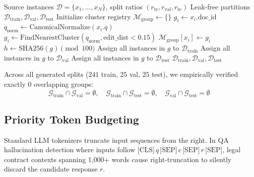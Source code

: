 \documentclass[conference]{IEEEtran}
\begin{document}
\begin{algorithm}[t]
\caption{Automated Anti-Leakage Clustering and Split Allocation}
\label{alg:leak_prevention}
\begin{algorithmic}[1]
\REQUIRE Source instances $\mathcal{D} = \{x_1, \dots, x_N\}$, split ratios $(r_{\text{tr}}, r_{\text{val}}, r_{\text{te}})$
\ENSURE Leak-free partitions $\mathcal{D}_{\text{train}}, \mathcal{D}_{\text{val}}, \mathcal{D}_{\text{test}}$
\STATE Initialize cluster registry $\mathcal{M}_{\text{group}} \leftarrow \{\}$
        \STATE $g_i \leftarrow x_i.\text{doc\_id}$
    \ELSE
        \STATE $q_{\text{norm}} \leftarrow \text{CanonicalNormalize}(x_i.q)$
        \STATE $g_i \leftarrow \text{FindNearestCluster}(q_{\text{norm}}, \text{edit\_dist} < 0.15)$
    \ENDIF
    \STATE $\mathcal{M}_{\text{group}}[x_i] \leftarrow g_i$
\ENDFOR
{}
    \STATE $h \leftarrow \text{SHA256}(g) \pmod{100}$
        \STATE Assign all instances in $g$ to $\mathcal{D}_{\text{train}}$
        \STATE Assign all instances in $g$ to $\mathcal{D}_{\text{val}}$
    \ELSE
        \STATE Assign all instances in $g$ to $\mathcal{D}_{\text{test}}$
    \ENDIF
\ENDFOR
\RETURN $\mathcal{D}_{\text{train}}, \mathcal{D}_{\text{val}}, \mathcal{D}_{\text{test}}$
\end{algorithmic}
\end{algorithm}

Across all generated splits ($241$ train, $25$ val, $25$ test), we empirically verified exactly $0$ overlapping groups:
\begin{equation}
\mathcal{G}_{\text{train}} \cap \mathcal{G}_{\text{val}} = \emptyset, \quad \mathcal{G}_{\text{train}} \cap \mathcal{G}_{\text{test}} = \emptyset, \quad \mathcal{G}_{\text{val}} \cap \mathcal{G}_{\text{test}} = \emptyset
\label{eq:zero_leakage}
\end{equation}

\subsection{Priority Token Budgeting}
Standard LLM tokenizers truncate input sequences from the right. In QA hallucination detection where inputs follow $\text{[CLS]} \, q \, \text{[SEP]} \, c \, \text{[SEP]} \, r \, \text{[SEP]}$, legal contract contexts spanning 1,000+ words cause right-truncation to silently discard the candidate response $r$. 
\end{document}
